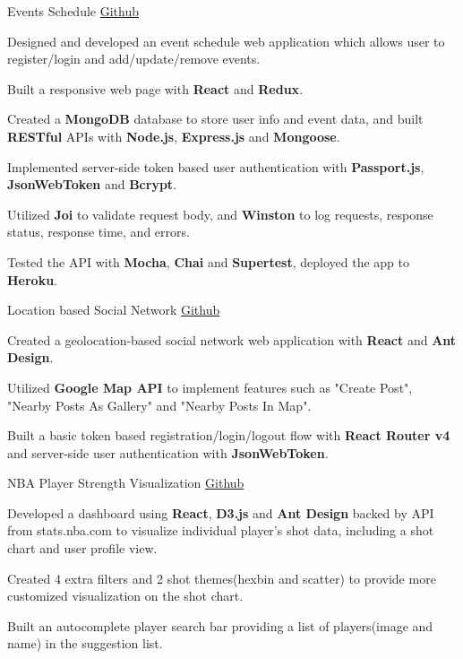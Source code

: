 \begin{cvprojects}
  \cvproject
    {Events Schedule}
    {\href{https://github.com/wuhxxx/event-schedule}{Github}}
    {}
    {
      \begin{cvitems}
        \item {Designed and developed an event schedule web application which allows user to register/login and add/update/remove events.}
        \item {Built a responsive web page with \textbf{React} and \textbf{Redux}.}
        \item {Created a \textbf{MongoDB} database to store user info and event data, and built \textbf{RESTful} APIs with \textbf{Node.js}, \textbf{Express.js} and \textbf{Mongoose}.}
        \item {Implemented server-side token based user authentication with \textbf{Passport.js}, \textbf{JsonWebToken} and \textbf{Bcrypt}.}
        \item {Utilized \textbf{Joi} to validate request body, and \textbf{Winston} to log requests, response status, response time, and errors.}
        \item {Tested the API with \textbf{Mocha}, \textbf{Chai} and \textbf{Supertest}, deployed the app to \textbf{Heroku}.}
      \end{cvitems}
    }
    
  \cvproject
    {Location based Social Network}
    {\href{https://github.com/wuhxxx/around}{Github}}
    {}
    {
      \begin{cvitems}
        \item {Created a geolocation-based social network web application with \textbf{React} and \textbf{Ant Design}.}
        \item {Utilized \textbf{Google Map API} to implement features such as "Create Post", "Nearby Posts As Gallery" and "Nearby Posts In Map".}
        \item {Built a basic token based registration/login/logout flow with \textbf{React Router v4} and server-side user authentication with \textbf{JsonWebToken}.}
      \end{cvitems}
    }

    
    \cvproject
    {NBA Player Strength Visualization}
    {\href{http://github.com/wuhxxx/nba-shotchart}{Github  }}
    {}
    {
      \begin{cvitems}
        \item {Developed a dashboard using \textbf{React}, \textbf{D3.js} and \textbf{Ant Design} backed by API from stats.nba.com to visualize individual player’s shot data, including a shot chart and user profile view.}
        \item {Created 4 extra filters and 2 shot themes(hexbin and scatter) to provide more customized visualization on the shot chart.}
        \item {Built an autocomplete player search bar providing a list of players(image and name) in the suggestion list.}
      \end{cvitems}
    }


\end{cvprojects}

